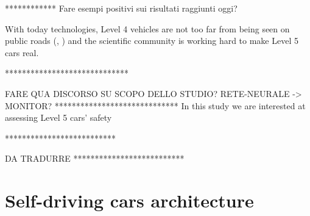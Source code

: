 ************    Fare esempi positivi sui risultati raggiunti oggi?\newline

With today technologies, Level 4 vehicles are not too far from being seen on public roads (\cite{Waymo}, \cite{Uber}) and the scientific community is working hard to make Level 5 cars real.\newline\newline

*****************************\newline\newline

FARE QUA DISCORSO SU SCOPO DELLO STUDIO? RETE-NEURALE -> MONITOR?
\newline\newline
*****************************\newline\newline
In this study we are interested at assessing Level 5 cars' safety

**************************

DA TRADURRE
**************************

\section{Self-driving cars architecture}

